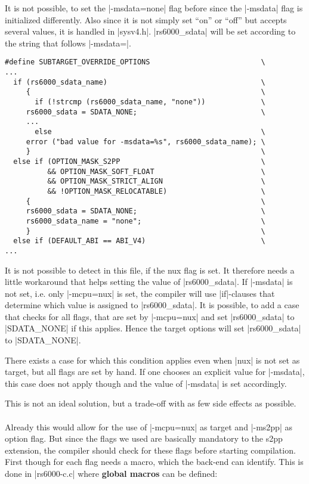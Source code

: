 It is not possible, to set the |-msdata=none| flag before since the |-msdata| flag is initialized differently.
Also since it is not simply set ``on'' or ``off'' but accepts several values, it is handled in |sysv4.h|.
|rs6000_sdata| will be set according to the string that follows |-msdata=|.
\begin{lstlisting}
#define SUBTARGET_OVERRIDE_OPTIONS                          \
...
  if (rs6000_sdata_name)                                    \
     {                                                      \
       if (!strcmp (rs6000_sdata_name, "none"))             \
     rs6000_sdata = SDATA_NONE;                             \
     ...
       else                                                 \
     error ("bad value for -msdata=%s", rs6000_sdata_name); \
     }                                                      \
  else if (OPTION_MASK_S2PP                                 \
          && OPTION_MASK_SOFT_FLOAT                         \
          && OPTION_MASK_STRICT_ALIGN                       \
          && !OPTION_MASK_RELOCATABLE)                      \
     {                                                      \
     rs6000_sdata = SDATA_NONE;                             \
     rs6000_sdata_name = "none";                            \
     }                                                      \
  else if (DEFAULT_ABI == ABI_V4)                           \
...
\end{lstlisting}

It is not possible to detect in this file, if the nux flag is set.
It therefore needs a little workaround that helps setting the value of |rs6000_sdata|.
If |-msdata| is not set, i.e. only |-mcpu=nux| is set, the compiler will use |if|-clauses that determine which value is assigned to |rs6000_sdata|.
It is possible, to add a case that checks for all flags, that are set by |-mcpu=nux| and set |rs6000_sdata| to |SDATA_NONE| if this applies.
Hence the target options will set |rs6000_sdata| to |SDATA_NONE|.

There exists a case for which this condition applies even when |nux| is not set as target, but all flags are set by hand.
If one chooses an explicit value for |-msdata|, this case does not apply though and the value of |-msdata| is set accordingly.

This is not an ideal solution, but a trade-off with as few side effects as possible.
\\
\\
Already this would allow for the use of |-mcpu=nux| as target and |-ms2pp| as option flag.
But since the flags we used are basically mandatory to the \ac{s2pp} extension, the compiler should check for these flags before starting compilation.
First though for each flag needs a macro, which the back-end can identify.
This is done in |rs6000-c.c| where \textbf{global macros} can be defined:

